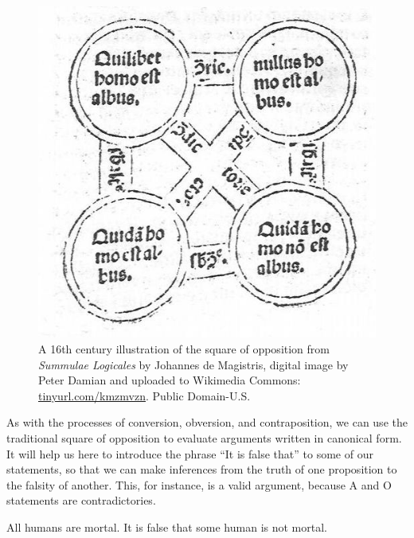 \begin{figure}
\begin{mdframed}[style=mytableclearbox]
\begin{center}
\includegraphics*[scale=.5]{img/Johannesmagistris-square}
\end{center}
\end{mdframed}
\caption{A 16th century illustration of the square of opposition from \textit{Summulae Logicales} by Johannes de Magistris, digital image by Peter Damian and uploaded to Wikimedia Commons: \protect\url{tinyurl.com/kmzmvzn}. Public Domain-U.S. }
\label{fig:majorsquare}
\end{figure}

As with the processes of conversion, obversion, and contraposition, we can use the traditional square of opposition to evaluate arguments written in canonical form. It will help us here to introduce the phrase ``It is false that'' to some of our statements, so that we can make inferences from the truth of one proposition to the falsity of another. This, for instance, is a valid argument, because A and O statements are contradictories.


\begin{earg*}
\item All humans are mortal.
\itemc[.45] It is false that some human is not mortal. 
\end{earg*} 

